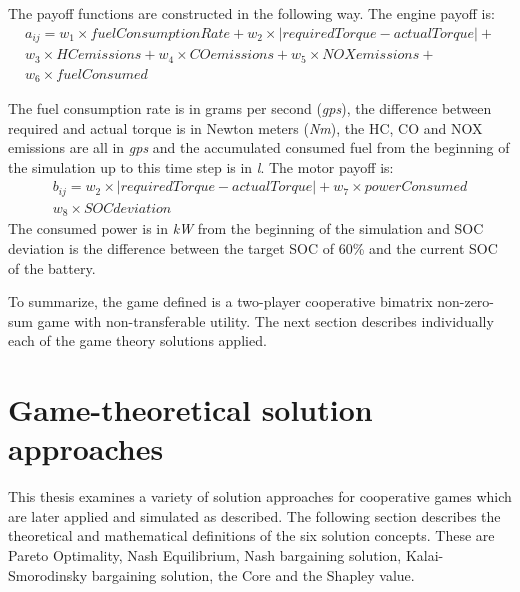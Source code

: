 {The payoff functions are constructed in the following way. The engine payoff is:
\begin{equation}
\label{eq:payoffEngine}
\begin{split}
a_{ij} = w_1 \times fuelConsumptionRate + w_2 \times | requiredTorque - actualTorque | + \\
w_3 \times HCemissions + w_4 \times COemissions + w_5 \times NOXemissions + \\
w_6 \times fuelConsumed
\end{split}
\end{equation}

The fuel consumption rate is in grams per second (\textit{gps}), the difference between required and actual torque is in Newton meters (\textit{Nm}), the HC, CO and NOX emissions are all in \textit{gps} and the accumulated consumed fuel from the beginning of the simulation up to this time step is in \textit{l}. The motor payoff is:
\begin{equation}
\label{eq:payoffMotor}
\begin{split}
b_{ij} = w_2 \times | requiredTorque - actualTorque | + w_7 \times powerConsumed\\
w_8 \times SOCdeviation
\end{split}
\end{equation}
The consumed power is in \textit{kW} from the beginning of the simulation and SOC deviation is the difference between the target SOC of 60\% and the current SOC of the battery.

To summarize, the game defined is a two-player cooperative bimatrix non-zero-sum game with non-transferable utility. The next section describes individually each of the game theory solutions applied.

\section{Game-theoretical solution approaches}
This thesis examines a variety of solution approaches for cooperative games which are later applied and simulated as described. The following section describes the theoretical and mathematical definitions of the six solution concepts. These are Pareto Optimality, Nash Equilibrium, Nash bargaining solution, Kalai-Smorodinsky bargaining solution, the Core and the Shapley value.

}
